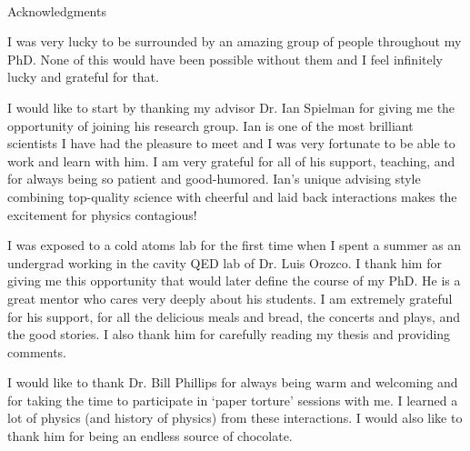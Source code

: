 
\renewcommand{\baselinestretch}{2}
\small\normalsize
\hbox{\ }
 
\vspace{-.65in}

\begin{center}
\large{Acknowledgments} 
\end{center} 

\vspace{1ex}

I was very lucky to be surrounded by an amazing group of people throughout my PhD. None of this would have been possible without them and I feel infinitely lucky and grateful for that. 

I would like to start by thanking my advisor Dr. Ian Spielman for giving me the opportunity of joining his research group. Ian is one of the most brilliant scientists I have had the pleasure to meet and I was very fortunate to be able to work and learn with him. I am very grateful for all of his support, teaching, and for always being so patient and good-humored. Ian's unique advising style combining top-quality science with cheerful and laid back interactions makes the excitement for physics contagious!

I was exposed to a cold atoms lab for the first time when I spent a summer as an undergrad working in the cavity QED lab of Dr. Luis Orozco. I thank him for giving me this opportunity that would later define the course of my PhD. He is a great mentor who cares very deeply about his students. I am extremely grateful for his support, for all the delicious meals and bread, the concerts and plays, and the good stories. I also thank him for carefully reading my thesis and providing comments. 

I would like to thank Dr. Bill Phillips for always being warm and welcoming and for taking the time to participate in `paper torture' sessions with me. I learned a lot of physics (and history of physics) from these interactions. I would also like to thank him for being an endless source of chocolate. 

